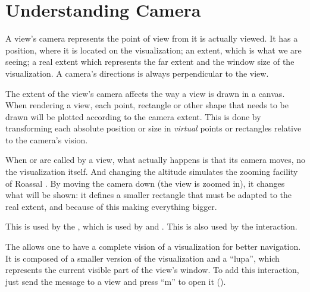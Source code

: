 \documentclass[a4paper,10pt,twoside]{book}
\begin{document}



\section{Understanding Camera} 

A view's camera represents the point of view from  it is actually viewed. It has a position, where it is located on the visualization; an extent, which is what we are seeing; a real extent which represents the far extent and the window size of the visualization. A camera's directions is always perpendicular to the view. 


The extent of the view's camera affects the way a view is drawn in a canvas. When rendering a view, each point, rectangle or other shape that needs to be drawn will be plotted according to the camera extent. This is done by transforming each absolute position or size in \emph{virtual} points or rectangles relative to the camera's vision.

When  or  are called by a view, what actually happens is that its camera moves, no the visualization itself. And changing the altitude simulates the zooming facility of Roassal . By moving the camera down (\ie the view is zoomed in), it changes what will be shown: it defines a smaller rectangle that must be adapted to the real extent, and because of this making everything bigger.%

This is used by the , which is used by  and . This is also used by the  interaction.

The  allows one to have a complete vision of a visualization for better navigation. It is composed of a smaller version of the visualization and a ``lupa'', which represents the current visible part of the view's window. To add this interaction, just send the  message to a view and press ``m'' to open it (). 
\end{document}
